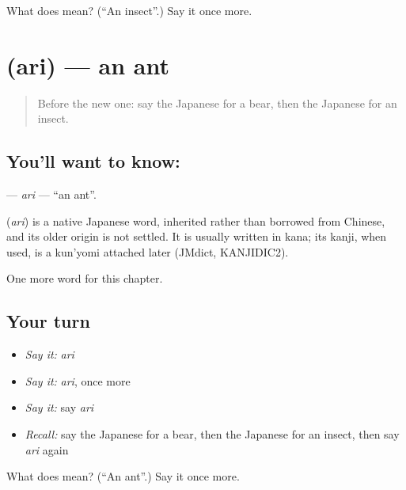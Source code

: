 \begin{tcolorbox}[breakable,colback=teal!4,colframe=teal!35!black,title={Before you move on}]
What does  mean? (\textquotedblleft{}An insect\textquotedblright{}.) Say it once more.
\end{tcolorbox}
\section[\texorpdfstring{\ja{あり} (ari)}{あり (ari)}]{ (ari) — an ant}

\label{lesson:JA-C46-ari}



\begin{quote}
Before the new one: say the Japanese for a bear, then the Japanese for an insect.
\end{quote}

\subsection*{You'll want to know: }
\textbf{} — \emph{ari} — \textquotedblleft{}an ant\textquotedblright{}.

\begin{cousinweb}
\textbf{} (\emph{ari}) is a native Japanese word, inherited rather than borrowed from Chinese, and its older origin is not settled. It is usually written in kana; its kanji, when used, is a kun'yomi attached later (JMdict, KANJIDIC2).
\end{cousinweb}

\begin{grammarlens}[title={What you've built}]
One more word for this chapter.
\end{grammarlens}

\subsection*{Your turn}
\begin{itemize}
\raggedright
  \item \emph{Say it:} \emph{ari}
  \item \emph{Say it:} \emph{ari}, once more
  \item \emph{Say it:} say \emph{ari}
  \item \emph{Recall:} say the Japanese for a bear, then the Japanese for an insect, then say \emph{ari} again
\end{itemize}

\begin{tcolorbox}[breakable,colback=teal!4,colframe=teal!35!black,title={Before you move on}]
What does  mean? (\textquotedblleft{}An ant\textquotedblright{}.) Say it once more.
\end{tcolorbox}
